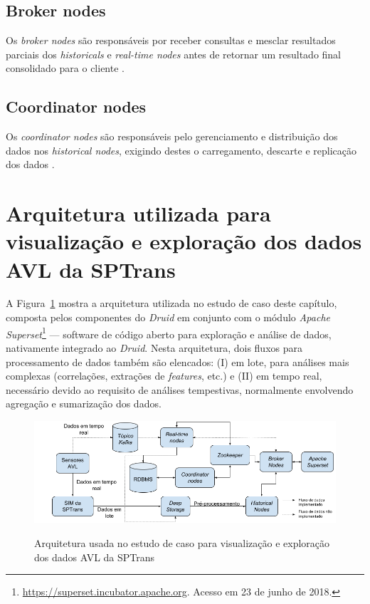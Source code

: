\documentclass[
	12pt,				%
	oneside,			%
	a4paper,			%
	english,			%
	brazil				%
	]{abntex2ppgsi}
\begin{document}
{{\subsection{Broker nodes}

Os \textit{broker nodes} são responsáveis por receber consultas e mesclar resultados parciais dos \textit{historicals} e \textit{real-time nodes} antes de retornar um resultado final consolidado para o cliente \cite{yang2014druid}.

\subsection{Coordinator nodes}

Os \textit{coordinator nodes} são responsáveis pelo gerenciamento e distribuição dos dados nos \textit {historical nodes}, exigindo destes o carregamento, descarte e replicação dos dados \cite{yang2014druid}.

\section{Arquitetura utilizada para visualização e exploração dos dados AVL da SPTrans}
\label{arch_viz}

A Figura~\ref{fig:viz_arch} mostra a arquitetura utilizada no estudo de caso deste capítulo, composta pelos componentes do \textit{Druid} em conjunto com o módulo \textit {Apache Superset}\footnote{\url{https://superset.incubator.apache.org}. Acesso em 23 de junho de 2018.} --- software de código aberto para exploração e análise de dados, nativamente integrado ao \textit{Druid}. Nesta arquitetura, dois fluxos para processamento de dados também são elencados: (I) em lote, para análises mais complexas (correlações, extrações de \textit{features}, etc.) e (II) em tempo real, necessário devido ao requisito de análises tempestivas, normalmente envolvendo agregação e sumarização dos dados.

\begin{figure}[!htb]%
	\centering
 	  \caption{Arquitetura usada no estudo de caso para visualização e exploração dos dados AVL da SPTrans}
		\includegraphics[width=1\linewidth]{images/viz_arch_pt.png}
	\label{fig:viz_arch}
\end{figure}

}}
\end{document}

